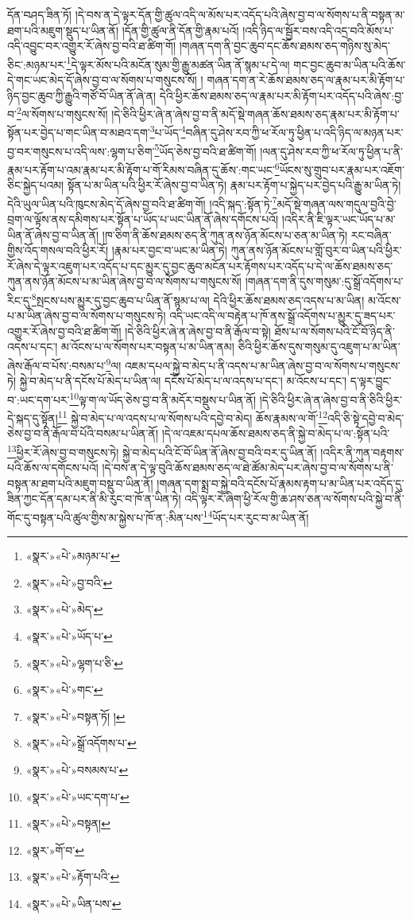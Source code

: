 དོན་བཤད་ཟིན་ཏོ། །དེ་བས་ན་དེ་ལྟར་དོན་གྱི་ཚུལ་འདི་ལ་མོས་པར་འདོད་པའི་ཞེས་བྱ་བ་ལ་སོགས་པ་ནི་བསྟན་མ་ཐག་པའི་མཇུག་སྡུད་པ་ཡིན་ནོ། །དོན་གྱི་ཚུལ་ནི་དོན་གྱི་རྣམ་པའོ། །འདི་ཉིད་ལ་སྦྱོར་བས་འདི་འདྲ་བའི་མོས་པ་འདི་འབྱུང་བར་འགྱུར་རོ་ཞེས་བྱ་བའི་ཐ་ཚིག་གོ། །གཞན་དག་ནི་བྱང་ཆུབ་དང་ཆོས་ཐམས་ཅད་གཉིས་སུ་མེད་ཅིང་:མཉམ་པར་\footnote{«སྣར་»«པེ་»མཉམ་པ་}དེ་ལྟར་མོས་པའི་མངོན་སུམ་གྱི་རྒྱུ་མཚན་ཡིན་ནོ་སྙམ་པ་དེ་ལ། གང་བྱང་ཆུབ་མ་ཡིན་པའི་ཆོས་དེ་གང་ཡང་མེད་དོ་ཞེས་བྱ་བ་ལ་སོགས་པ་གསུངས་སོ། །
གཞན་དག་ན་རེ་ཆོས་ཐམས་ཅད་ལ་རྣམ་པར་མི་རྟོག་པ་ཉིད་བྱང་ཆུབ་ཀྱི་རྒྱུའི་གཙོ་བོ་ཡིན་ནོ་ཞེ་ན། དེའི་ཕྱིར་ཆོས་ཐམས་ཅད་ལ་རྣམ་པར་མི་རྟོག་པར་འདོད་པའི་ཞེས་:བྱ་བ་\footnote{«སྣར་»«པེ་»བྱ་བའི་}ལ་སོགས་པ་གསུངས་སོ། །དེ་ཅིའི་ཕྱིར་ཞེ་ན་ཞེས་བྱ་བ་ནི་མདོ་སྡེ་གཞན་ཆོས་ཐམས་ཅད་རྣམ་པར་མི་རྟོག་པ་སྟོན་པར་བྱེད་པ་གང་ཡིན་བ་མཐའ་དག་\footnote{«སྣར་»«པེ་»མེད་}པ་ཡོད་\footnote{«སྣར་»«པེ་»ཡོད་པ་}བཞིན་དུ་ཤེས་རབ་ཀྱི་ཕ་རོལ་ཏུ་ཕྱིན་པ་འདི་ཉིད་ལ་མཉན་པར་བྱ་བར་གསུངས་པ་འདི་ལས་:ལྷག་པ་ཅིག་\footnote{«སྣར་»«པེ་»ལྷག་པ་ཅི་}ཡོད་ཅེས་བྱ་བའི་ཐ་ཚིག་གོ། །ལན་དུ་ཤེས་རབ་ཀྱི་ཕ་རོལ་ཏུ་ཕྱིན་པ་ནི་རྣམ་པར་རྟོག་པ་འམ་རྣམ་པར་མི་རྟོག་པ་གོ་རིམས་བཞིན་དུ་ཆོས་:གང་ཡང་\footnote{«སྣར་»«པེ་»གང་}ཡོངས་སུ་གྲུབ་པར་རྣམ་པར་འཇོག་ཅིང་སྐྱེད་པའམ། སྟོན་པ་མ་ཡིན་པའི་ཕྱིར་རོ་ཞེས་བྱ་བ་ཡིན་ཏེ། རྣམ་པར་རྟོག་པ་སྐྱེད་པར་བྱེད་པའི་རྒྱུ་མ་ཡིན་ཏེ། དེའི་ཡུལ་ཡིན་པའི་ཁུངས་མེད་དོ་ཞེས་བྱ་བའི་ཐ་ཚིག་གོ། །འདི་སྐད་:སྟོན་ཏེ་\footnote{«སྣར་»«པེ་»བསྟན་ཏོ། །}མདོ་སྡེ་གཞན་ལས་གདུལ་བྱའི་བྱེ་བྲག་ལ་ལྟོས་ནས་དམིགས་པར་སྟོན་པ་ཡོད་པ་ཡང་ཡིན་ནོ་ཞེས་དགོངས་པའོ། །འདིར་ནི་ཇི་ལྟར་ཡང་ཡོད་པ་མ་ཡིན་ནོ་ཞེས་བྱ་བ་ཡིན་ནོ། །ཁ་ཅིག་ནི་ཆོས་ཐམས་ཅད་ནི་ཀུན་ནས་ཉོན་མོངས་པ་ཅན་མ་ཡིན་ཏེ། རང་བཞིན་གྱིས་འོད་གསལ་བའི་ཕྱིར་རོ། །རྣམ་པར་བྱང་བ་ཡང་མ་ཡིན་ཏེ། ཀུན་ནས་ཉོན་མོངས་པ་གློ་བུར་བ་ཡིན་པའི་ཕྱིར་རོ་ཞེས་དེ་ལྟར་འཇུག་པར་འདོད་པ་དང་མྱུར་དུ་བྱང་ཆུབ་མངོན་པར་རྟོགས་པར་འདོད་པ་དེ་ལ་ཆོས་ཐམས་ཅད་ཀུན་ནས་ཉོན་མོངས་པ་མ་ཡིན་ཞེས་བྱ་བ་ལ་སོགས་པ་གསུངས་སོ། །གཞན་དག་ནི་དུས་གསུམ་:དུ་སྒྲོ་འདོགས་པ་རིང་དུ་\footnote{«སྣར་»«པེ་»སྒྲོ་འདོགས་པ་}སྤངས་པས་མྱུར་དུ་བྱང་ཆུབ་པ་ཡིན་ནོ་སྙམ་པ་ལ། དེའི་ཕྱིར་ཆོས་ཐམས་ཅད་འདས་པ་མ་ཡིན། མ་འོངས་པ་མ་ཡིན་ཞེས་བྱ་བ་ལ་སོགས་པ་གསུངས་ཏེ། འདི་ཡང་འདི་ལ་བརྟེན་པ་ཁོ་ནས་སྒྲོ་འདོགས་པ་མྱུར་དུ་ཟད་པར་འགྱུར་རོ་ཞེས་བྱ་བའི་ཐ་ཚིག་གོ། །དེ་ཅིའི་ཕྱིར་ཞེ་ན་ཞེས་བྱ་བ་ནི་རྒོལ་བ་སྟེ། ཐོས་པ་ལ་སོགས་པའི་ངོ་བོ་ཉིད་ནི་འདས་པ་དང་། མ་འོངས་པ་ལ་སོགས་པར་བསྟན་པ་མ་ཡིན་ནམ། ཅིའི་ཕྱིར་ཆོས་དུས་གསུམ་དུ་འཇུག་པ་མ་ཡིན་ཞེས་རྒོལ་བ་པོས་:བསམ་པ་\footnote{«སྣར་»«པེ་»བསམས་པ་}ལ། འཇམ་དཔལ་སྐྱེ་བ་མེད་པ་ནི་འདས་པ་མ་ཡིན་ཞེས་བྱ་བ་ལ་སོགས་པ་གསུངས་ཏེ། སྐྱེ་བ་མེད་པ་ནི་དངོས་པོ་མེད་པ་ཡིན་ལ། དངོས་པོ་མེད་པ་ལ་འདས་པ་དང་། མ་འོངས་པ་དང་། ད་ལྟར་བྱུང་བ་:ཡང་དག་པར་\footnote{«སྣར་»«པེ་»ཡང་དག་པ་}ལྟ་ག་ལ་ཡོད་ཅེས་བྱ་བ་ནི་མདོར་བསྡུས་པ་ཡིན་ནོ། །དེ་ཅིའི་ཕྱིར་ཞེ་ན་ཞེས་བྱ་བ་ནི་ཅིའི་ཕྱིར་དེ་སྐད་དུ་སྟོན།\footnote{«སྣར་»«པེ་»བསྟན།} སྐྱེ་བ་མེད་པ་ལ་འདས་པ་ལ་སོགས་པའི་དབྱེ་བ་མེད། ཆོས་རྣམས་ལ་གོ་\footnote{«སྣར་»གོ་བ་}འདི་ཅི་སྟེ་དབྱེ་བ་མེད་ཅེས་བྱ་བ་ནི་རྒོལ་བ་པོའི་བསམ་པ་ཡིན་ནོ། །དེ་ལ་འཇམ་དཔལ་ཆོས་ཐམས་ཅད་ནི་སྐྱེ་བ་མེད་པ་ལ་:སྟོན་པའི་\footnote{«སྣར་»«པེ་»རྟོག་པའི་}ཕྱིར་རོ་ཞེས་བྱ་བ་གསུངས་ཏེ། སྐྱེ་བ་མེད་པའི་ངོ་བོ་ཡིན་ནོ་ཞེས་བྱ་བའི་བར་དུ་ཡིན་ནོ། །འདིར་ནི་ཀུན་བརྟགས་པའི་ཆོས་ལ་དགོངས་པའོ། །དེ་བས་ན་དེ་ལྟ་བུའི་ཆོས་ཐམས་ཅད་ལ་ཐེ་ཚོམ་མེད་པར་ཞེས་བྱ་བ་ལ་སོགས་པ་ནི་བསྟན་མ་ཐག་པའི་མཇུག་བསྡུ་བ་ཡིན་ནོ། །གཞན་དག་སྨྲ་བ་སྐྱེ་བའི་དངོས་པོ་རྣམས་རྟག་པ་མ་ཡིན་པར་འདོད་དུ་ཟིན་ཀྱང་དོན་དམ་པར་ནི་མི་རུང་བ་ཁོ་ན་ཡིན་ཏེ། འདི་ལྟར་རེ་ཞིག་ཕྱི་རོལ་གྱི་ཆ་ཤས་ཅན་ལ་སོགས་པའི་སྐྱེ་བ་ནི་གོང་དུ་བསྟན་པའི་ཚུལ་གྱིས་མ་སྐྱེས་པ་ཁོ་ན་:མིན་པས་\footnote{«སྣར་»«པེ་»ཡིན་པས་}ཡོད་པར་རུང་བ་མ་ཡིན་ནོ། 
